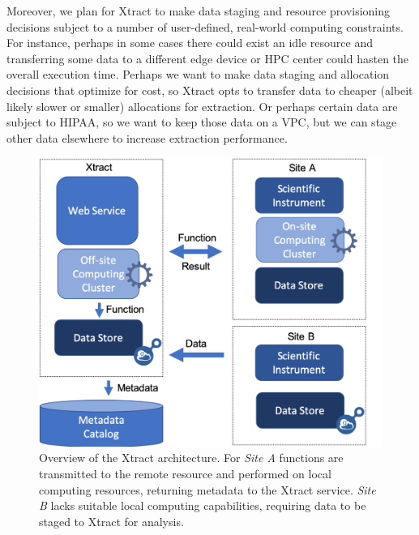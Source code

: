 \documentclass[sigconf, 9pt]{acmart}
\newcommand{\kyle}[1]{}
\newcommand{\kyle}[1]{{\textcolor{purple}{ Kyle: #1 }}}
\newcommand{\name}{Xtract}
\begin{document}
\kyle{Maybe the following paragraph should be moved to a future work? We should think 
about how to structure this.  Should we make this more of a complete vision and then outline
our prototype? Or outline our prototype and then describe where its going?} 
Moreover, we 
plan for \name{} to make data staging and resource provisioning decisions subject to a number of user-defined, real-world computing constraints. For instance, 
perhaps in some cases there could exist an idle resource and transferring some data to a different edge device or HPC center could hasten 
the overall execution time.  Perhaps we want to make data staging and allocation decisions that optimize for cost, so \name{} opts to transfer 
data to cheaper (albeit likely slower or smaller) allocations for extraction.  Or perhaps certain data are subject to HIPAA, so we want to keep 
those data on a VPC, but we can stage other data elsewhere to increase extraction performance. 

\begin{figure}[t]
	\centering
	\includegraphics[scale=0.2]{figs/new-arch.png}
	\caption{Overview of the \name{} architecture. For \textit{Site A} functions are transmitted to the remote resource and performed on local computing resources, returning metadata to the \name{} service. \textit{Site B} lacks suitable local
	computing capabilities, requiring data to be staged to \name{} for analysis.}
	\label{fig:arch}
\end{figure}
\end{document}
